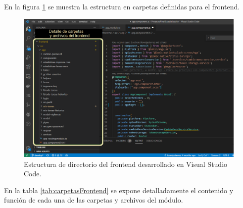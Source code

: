 \pagebreak
En la figura \ref{fig:frontendCarpetas} se muestra la estructura en carpetas definidas para el frontend.

\begin{figure}[ht]
	\centering
	\includegraphics[width=1\textwidth]{./Figures/frontendCarpetas.png}
	\caption{Estructura de directorio del frontend desarrollado en Visual Studio Code.}
	\label{fig:frontendCarpetas}
\end{figure}


En la tabla \ref{tab:carpetasFrontend}  se expone detalladamente el contenido y función de cada una de las carpetas y archivos del módulo.

